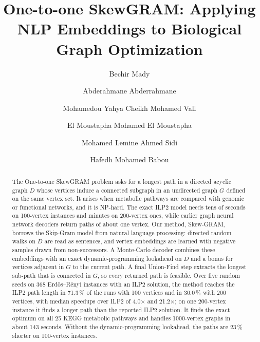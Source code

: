 \documentclass{llncs}
\begin{document}
\title{One-to-one SkewGRAM: Applying NLP Embeddings to Biological Graph Optimization}

\author{Bechir Mady \and
Abderahmane Abderrahmane \and
Mohamedou Yahya Cheikh Mohamed Vall \and
El Moustapha Mohamed El Moustapha \and
Mohamed Lemine Ahmed Sidi \and
Hafedh Mohamed Babou}


\maketitle

\begin{abstract}
The One-to-one SkewGRAM problem asks for a longest path in a directed acyclic graph $D$ whose vertices induce a connected subgraph in an undirected graph $G$ defined on the same vertex set. It arises when metabolic pathways are compared with genomic or functional networks, and it is NP-hard. The exact ILP2 model needs tens of seconds on 100-vertex instances and minutes on 200-vertex ones, while earlier graph neural network decoders return paths of about one vertex. Our method, Skew-GRAM, borrows the Skip-Gram model from natural language processing: directed random walks on $D$ are read as sentences, and vertex embeddings are learned with negative samples drawn from non-successors. A Monte-Carlo decoder combines these embeddings with an exact dynamic-programming lookahead on $D$ and a bonus for vertices adjacent in $G$ to the current path. A final Union-Find step extracts the longest sub-path that is connected in $G$, so every returned path is feasible. Over five random seeds on 368 Erd\H{o}s--Rényi instances with an ILP2 solution, the method reaches the ILP2 path length in 71.3\,\% of the runs with 100 vertices and in 30.0\,\% with 200 vertices, with median speedups over ILP2 of 4.0$\times$ and 21.2$\times$; on one 200-vertex instance it finds a longer path than the reported ILP2 solution. It finds the exact optimum on all 25 KEGG metabolic pathways and handles 1000-vertex graphs in about 143 seconds. Without the dynamic-programming lookahead, the paths are 23\,\% shorter on 100-vertex instances.

\end{abstract}
\end{document}
